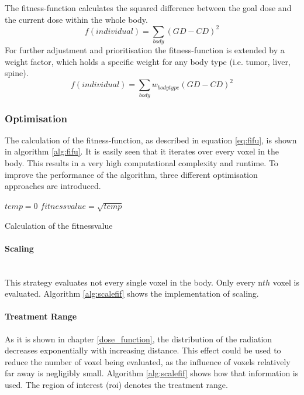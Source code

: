 \documentclass[12pt]{article}
\begin{document}
 The fitness-function calculates the squared difference between the goal dose and the current dose within the whole body.
 \begin{equation}
 f(individual) = \sum_{body}(GD-CD)^2
 \end{equation}
 For further adjustment and prioritisation the fitness-function is extended by a weight factor, which holds a specific weight for any body type (i.e. tumor, liver, spine).
 \begin{equation}
 \label{eq:fifu}
 f(individual) = \sum_{body}w_{bodytype}(GD-CD)^2
 \end{equation}

\subsubsection{Optimisation}
\label{subsubsec:optimisation}
The calculation of the fitness-function, as described in equation \eqref{eq:fifu}, is shown in algorithm \ref{alg:fifu}. It is easily seen that it iterates over every voxel in the body. This results in a very high computational complexity and runtime. To improve the performance of the algorithm, three different optimisation approaches are introduced. \\

\begin{algorithm}[H]
\label{alg:fifu}
 $temp=0$\;
 $fitnessvalue = \sqrt{temp}$\;
 \;
 \caption{Calculation of the fitnessvalue}
 
 \end{algorithm}


\paragraph{Scaling}
\label{para:scaling}
~\\
This strategy evaluates not every single voxel in the body. Only every n$th$ voxel is evaluated. Algorithm \ref{alg:scalefif} shows the implementation of scaling. \\

\paragraph{Treatment Range}
\label{para:treatment range}
As it is shown in chapter \ref{dose_function}, the distribution of the radiation decreases exponentially with increasing distance. This effect could be used to reduce the number of voxel being evaluated, as the influence of voxels relatively far away is negligibly small. Algorithm \ref{alg:scalefif} shows how that information is used. The region of interest (roi) denotes the treatment range. \\
\end{document}
